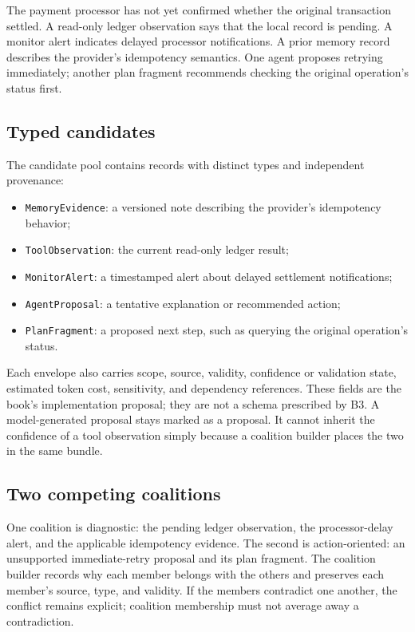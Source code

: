 \BookExampleLabel{} The payment processor has not yet confirmed whether the original transaction settled. A read-only ledger observation says that the local record is pending. A monitor alert indicates delayed processor notifications. A prior memory record describes the provider's idempotency semantics. One agent proposes retrying immediately; another plan fragment recommends checking the original operation's status first.

\subsection{Typed candidates}

The candidate pool contains records with distinct types and independent provenance:
\begin{itemize}
  \item \texttt{MemoryEvidence}: a versioned note describing the provider's idempotency behavior;
  \item \texttt{ToolObservation}: the current read-only ledger result;
  \item \texttt{MonitorAlert}: a timestamped alert about delayed settlement notifications;
  \item \texttt{AgentProposal}: a tentative explanation or recommended action;
  \item \texttt{PlanFragment}: a proposed next step, such as querying the original operation's status.
\end{itemize}

Each envelope also carries scope, source, validity, confidence or validation state, estimated token cost, sensitivity, and dependency references. These fields are the book's implementation proposal; they are not a schema prescribed by B3. A model-generated proposal stays marked as a proposal. It cannot inherit the confidence of a tool observation simply because a coalition builder places the two in the same bundle.

\subsection{Two competing coalitions}

One coalition is diagnostic: the pending ledger observation, the processor-delay alert, and the applicable idempotency evidence. The second is action-oriented: an unsupported immediate-retry proposal and its plan fragment. The coalition builder records why each member belongs with the others and preserves each member's source, type, and validity. If the members contradict one another, the conflict remains explicit; coalition membership must not average away a contradiction.

